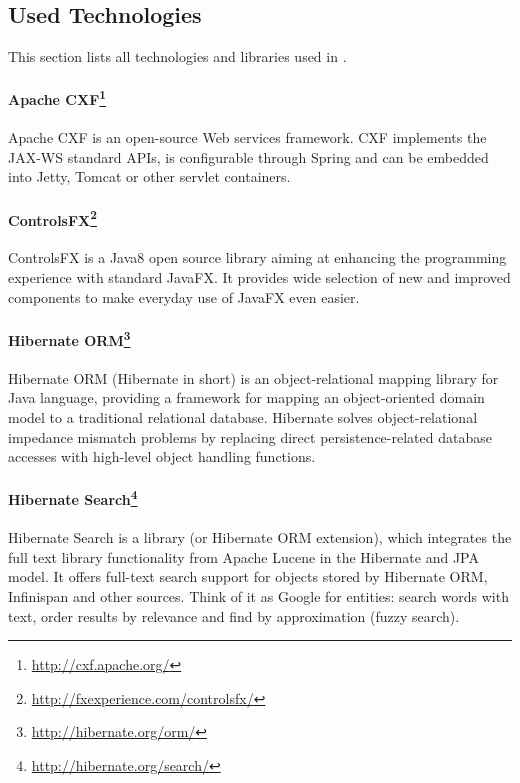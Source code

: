 
\subsection{Used Technologies}

This section lists all technologies and libraries used in \textan{}.

\paragraph{Apache CXF\footnote{\url{http://cxf.apache.org/}}}
Apache CXF is an open-source Web services framework. CXF implements the JAX-WS
standard APIs, is configurable through Spring and can be embedded into Jetty,
Tomcat or other servlet containers.

\paragraph{ControlsFX\footnote{\url{http://fxexperience.com/controlsfx/}}}
ControlsFX is a Java8 open source library aiming at enhancing the programming
experience with standard JavaFX. It provides wide selection of new and improved
components to make everyday use of JavaFX even easier.

\paragraph{Hibernate ORM\footnote{\url{http://hibernate.org/orm/}}}
Hibernate ORM (Hibernate in short) is an object-relational mapping library for
Java language, providing a framework for mapping an object-oriented domain
model to a traditional relational database. Hibernate solves object-relational
im\-pedance mismatch problems by replacing direct persistence-related database
accesses with high-level object handling functions.

\paragraph{Hibernate Search\footnote{\url{http://hibernate.org/search/}}}
Hibernate Search is a library (or Hibernate ORM extension), which integrates
the full text library functionality from Apache Lucene in the Hibernate and
JPA model. It offers full-text search support for objects stored by Hibernate
ORM, Infinispan and other sources. Think of it as Google\texttrademark{} for
entities: search words with text, order results by relevance and find by
approximation (fuzzy search).

